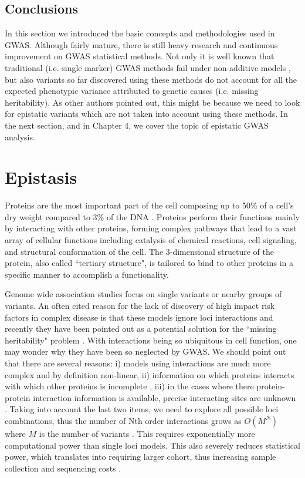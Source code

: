 \subsection{Conclusions}

In this section we introduced the basic concepts and methodologies used in GWAS. Although fairly mature, there is still heavy research and continuous improvement on GWAS statistical methods. Not only it is well known that traditional (i.e. single marker) GWAS methods fail under non-additive models \cite{culverhouse2002perspective}, but also variants so far discovered using these methods do not account for all the expected phenotypic variance attributed to genetic causes (i.e. missing heritability). As other authors pointed out, this might be because we need to look for epistatic variants which are not taken into account using these methods. In the next section, and in Chapter 4, we cover the topic of epistatic GWAS analysis.

\section{Epistasis \label{sec:epi}}

Proteins are the most important part of the cell composing up to 50\% of a cell’s dry weight compared to 3\% of the DNA \cite{alberts1995molecular}. Proteins perform their functions mainly by interacting with other proteins, forming complex pathways that lead to a vast array of cellular functions including catalysis of chemical reactions, cell signaling, and structural conformation of the cell. The 3-dimensional structure of the protein, also called ``tertiary structure", is tailored to bind to other proteins in a specific manner to accomplish a functionality. 

Genome wide association studies focus on single variants or nearby groups of variants. An often cited reason for the lack of discovery of high impact risk factors in complex disease is that these models ignore loci interactions \cite{cordell2009detecting} and recently they have been pointed out as a potential solution for the ``missing heritability" problem \cite{zuk2012mystery, zuk2014searching}. With interactions being so ubiquitous in cell function, one may wonder why they have been so neglected by GWAS. We should point out that there are several reasons: i) models using interactions are much more complex \cite{gao2010classification} and by definition non-linear, ii) information on which proteins interacts with which other proteins is incomplete \cite{venkatesan2009empirical}, iii) in the cases where there protein-protein interaction information is available, precise interacting sites are unknown \cite{venkatesan2009empirical}. Taking into account the last two items, we need to explore all possible loci combinations, thus the number of Nth order interactions grows as $O(M^N)$ where $M$ is the number of variants \cite{de2013emerging}. This requires exponentially more computational power than single loci models. This also severely reduces statistical power, which translates into requiring larger cohort, thus increasing sample collection and sequencing costs \cite{de2013emerging}.

